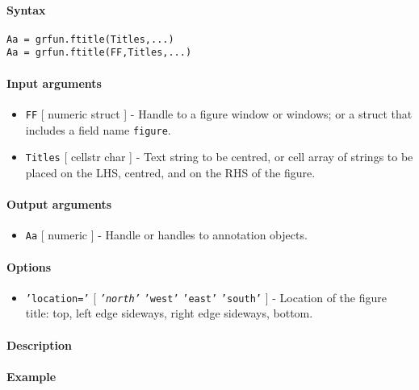 


	\paragraph{Syntax}

\begin{verbatim}
Aa = grfun.ftitle(Titles,...)
Aa = grfun.ftitle(FF,Titles,...)
\end{verbatim}

\paragraph{Input arguments}

\begin{itemize}
\item
  \texttt{FF} {[} numeric \textbar{} struct {]} - Handle to a figure
  window or windows; or a struct that includes a field name
  \texttt{figure}.
\item
  \texttt{Titles} {[} cellstr \textbar{} char {]} - Text string to be
  centred, or cell array of strings to be placed on the LHS, centred,
  and on the RHS of the figure.
\end{itemize}

\paragraph{Output arguments}

\begin{itemize}
\itemsep1pt\parskip0pt
\item
  \texttt{Aa} {[} numeric {]} - Handle or handles to annotation objects.
\end{itemize}

\paragraph{Options}

\begin{itemize}
\itemsep1pt\parskip0pt
\item
  \texttt{'location='} {[} \emph{\texttt{'north'}} \textbar{}
  \texttt{'west'} \textbar{} \texttt{'east'} \textbar{} \texttt{'south'}
  {]} - Location of the figure title: top, left edge sideways, right
  edge sideways, bottom.
\end{itemize}

\paragraph{Description}

\paragraph{Example}


